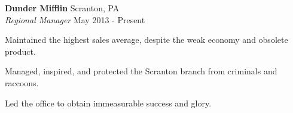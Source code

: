 \textbf{Dunder Mifflin} \hfill Scranton, PA\\
\textit{Regional Manager} \hfill May 2013 - Present\\
\vspace*{-4pt}
\begin{achievements}
	\item Maintained the highest sales average, despite the weak economy and obsolete product.
	\item Managed, inspired, and protected the Scranton branch from criminals and raccoons.
	\item Led the office to obtain immeasurable success and glory.
\end{achievements}
